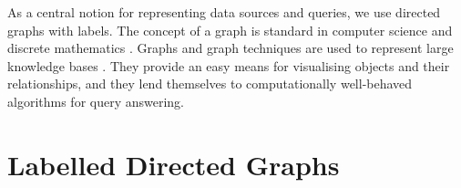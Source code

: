 As 
a central notion for representing data sources
and queries, we use directed graphs with labels.
The concept of a graph is standard in computer science and discrete mathematics \cite{Diestel2012}.
Graphs and graph techniques are used to represent large knowledge bases \cite{Ehrlinger2016}.
They provide an easy means for visualising objects and their relationships,
and they lend themselves to computationally well-behaved algorithms for query answering. 


\section{Labelled Directed Graphs}
\label{sec:labelled_digraphs}

